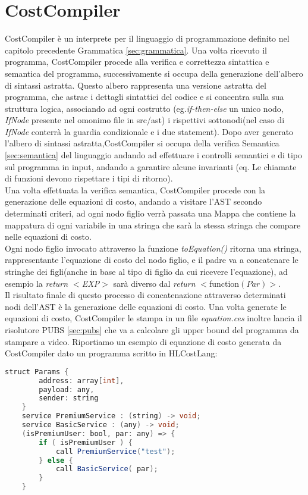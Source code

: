 \documentclass[../../main.tex]{subfiles}
\begin{document}
\chapter{CostCompiler}
CostCompiler è un interprete per il linguaggio di programmazione definito nel capitolo precedente Grammatica \ref{sec:grammatica}. Una volta ricevuto il programma, CostCompiler procede alla verifica e correttezza sintattica e semantica del programma, successivamente si occupa della generazione dell'albero di sintassi astratta. 
Questo albero rappresenta una versione astratta del programma, che astrae i dettagli sintattici del codice e si concentra sulla sua struttura logica, associando ad ogni costrutto (eg.\textit{if-then-else} un unico nodo, \textit{IfNode} presente nel omonimo file in src/ast) i rispettivi sottonodi(nel caso di \textit{IfNode} conterrà la guardia condizionale e i due statement).
Dopo aver generato l'albero di sintassi astratta,CostCompiler si occupa della verifica Semantica \ref{sec:semantica} del linguaggio andando ad effettuare i controlli semantici e di tipo sul programma in input, andando a garantire alcune invarianti (eq. Le chiamate di funzioni devono rispettare i tipi di ritorno).\\
Una volta effettuata la verifica semantica, CostCompiler procede con la generazione delle equazioni di costo, andando a visitare l'AST secondo determinati criteri, ad ogni nodo figlio verrà passata una Mappa che contiene la mappatura di ogni variabile in una stringa che sarà la stessa stringa che compare nelle equazioni di costo.\\
Ogni nodo figlio invocato attraverso la funzione \textit{toEquation()} ritorna una stringa, rappresentante l'equazione di costo del nodo figlio, e il padre va a concatenare le stringhe dei figli(anche in base al tipo di figlio da cui ricevere l'equazione), ad esempio la \textit{return $<$EXP$>$ } sarà diverso dal \textit{return }$<$function$(Par)>$.\\
Il risultato finale di questo processo di concatenazione attraverso determinati nodi dell'AST è la generazione delle equazioni di costo. 
Una volta generate le equazioni di costo, CostCompiler le stampa in un file \textit{equation.ces} inoltre lancia il risolutore PUBS \ref{sec:pubs} che va a calcolare gli upper bound del programma da stampare a video.
Riportiamo un esempio di equazione di costo generata da CostCompiler dato un programma scritto in HLCostLang:
    \begin{lstlisting}[language=Java, caption={Listing8}]
    struct Params {
        address: array[int],
        payload: any,
        sender: string
    }
    service PremiumService : (string) -> void;
    service BasicService : (any) -> void;
    (isPremiumUser: bool, par: any) => {
        if ( isPremiumUser ) {
            call PremiumService("test");
        } else {
            call BasicService( par);
        }
    }
\end{lstlisting}
\end{document}
